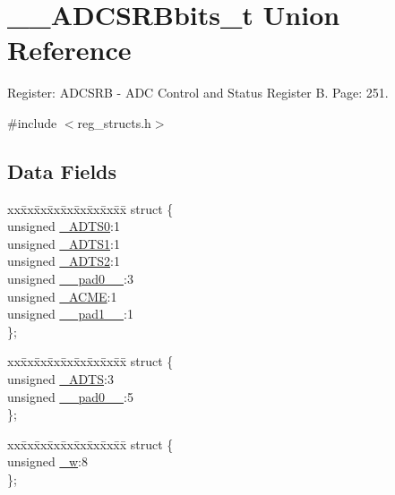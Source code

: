\hypertarget{union_____a_d_c_s_r_bbits__t}{\section{\+\_\+\+\_\+\+A\+D\+C\+S\+R\+Bbits\+\_\+t Union Reference}
\label{union_____a_d_c_s_r_bbits__t}
}


Register\+: A\+D\+C\+S\+R\+B -\/ A\+D\+C Control and Status Register B. Page\+: 251.  




{\ttfamily \#include $<$reg\+\_\+structs.\+h$>$}

\subsection*{Data Fields}
\begin{DoxyCompactItemize}
\item 
\begin{tabbing}
xx\=xx\=xx\=xx\=xx\=xx\=xx\=xx\=xx\=\kill
struct \{\\
\>unsigned \hyperlink{union_____a_d_c_s_r_bbits__t_a103c16c4d0a7ae86245bc3f5a170196c}{\_ADTS0}:1\\
\>unsigned \hyperlink{union_____a_d_c_s_r_bbits__t_a290301f179d6d0e7840840ef5626dfa2}{\_ADTS1}:1\\
\>unsigned \hyperlink{union_____a_d_c_s_r_bbits__t_a337f192f4bffddc8ebc0aea77f66d2a1}{\_ADTS2}:1\\
\>unsigned \hyperlink{union_____a_d_c_s_r_bbits__t_a8405cf8419325c29fa3ed69b02b95ade}{\_\_pad0\_\_}:3\\
\>unsigned \hyperlink{union_____a_d_c_s_r_bbits__t_acf30e407b6de285ce1b4529f5621a5b0}{\_ACME}:1\\
\>unsigned \hyperlink{union_____a_d_c_s_r_bbits__t_ab26eaaa87a5eb5c5e30ac606395a2502}{\_\_pad1\_\_}:1\\
\}; \\

\end{tabbing}\item 
\begin{tabbing}
xx\=xx\=xx\=xx\=xx\=xx\=xx\=xx\=xx\=\kill
struct \{\\
\>unsigned \hyperlink{union_____a_d_c_s_r_bbits__t_a831946aed8a0315a3951fb1321399736}{\_ADTS}:3\\
\>unsigned \hyperlink{union_____a_d_c_s_r_bbits__t_a8405cf8419325c29fa3ed69b02b95ade}{\_\_pad0\_\_}:5\\
\}; \\

\end{tabbing}\item 
\begin{tabbing}
xx\=xx\=xx\=xx\=xx\=xx\=xx\=xx\=xx\=\kill
struct \{\\
\>unsigned \hyperlink{union_____a_d_c_s_r_bbits__t_ae618e28956c522249172f57e63f563c6}{\_w}:8\\
\}; \\

\end{tabbing}\end{DoxyCompactItemize}


